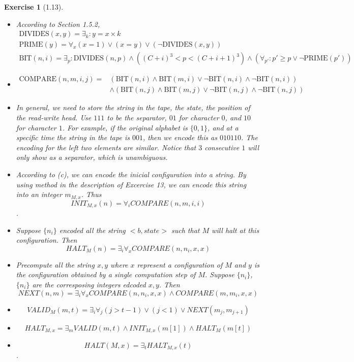 \documentclass[a4paper]{article}
\newtheorem*{exercise}{Exercise}
\newcommand{\bin}{\{0,1\}}
\begin{document}
\begin{exercise}[1.13]
	\begin{itemize}
		\item[(a)] According to Section 1.5.2, 
            \begin{gather*}
                \text{DIVIDES}(x,y)=\exists_k: y=x\times k\\
                \text{PRIME}(y)=\forall_x (x=1)\vee(x=y)\vee(\neg\text{DIVIDES}(x,y))\\
                \text{BIT}(n,i)=\exists_p: \text{DIVIDES}(n,p)\wedge ((C+i)^3<p<(C+i+1)^3) 
                \wedge (\forall_{p'}: p'\geq p\vee\neg\text{PRIME}(p'))
            \end{gather*}

		\item[(b)] 
            \begin{align*}
                \text{COMPARE}(n,m,i,j)=&(\text{BIT}(n,i)\wedge\text{BIT}(m,i)\vee\neg\text{BIT}(n,i)\wedge\neg\text{BIT}(n,i))\\
                &\wedge(\text{BIT}(n,j)\wedge\text{BIT}(m,j)\vee\neg\text{BIT}(n,j)\wedge\neg\text{BIT}(n,j))
            \end{align*}
	    \item[(c)] In general, we need to store the string in the tape, the state,
            the position of the read-write head. 
            Use $111$ to be the separator, $01$ for character $0$, and $10$ for character $1$. 
            For example, if the original alphabet is $\bin$, and at a specific time the string in the tape is $001$, 
            then we encode this as $010110$. The encoding for the left two elements are similar. 
            Notice that $3$ consecutive $1$ will only show as a separator, which is unambiguous.

\item[(d)] According to (c), we can encode the inicial configuration into a string. By using method in the description of Excercise 13, we can encode this string into an integer $m_{M,x}$. Thus 
$$INIT_{M,x}(n)=\forall_i COMPARE(n,m,i,i)$$.
\item[(e)] Suppose $\{n_i\}$ encoded all the string $<b,state>$ such that $M$ will halt at this configuration. Then 
$$
HALT_M(n)=\exists_i \forall_x COMPARE(n,n_i,x,x)
$$   
\item[(f)] Precompute all the string $x,y$ where $x$ represent a configuration of $M$ and $y$ is the configuration obtained by a single computation step of $M$. Suppose $\{n_i\}$,$\{n_i\}$ are the corresposing integers edcoded $x,y$.
Then 
$$
NEXT(n,m)=\exists_i\forall_x COMPARE(n,n_i,x,x)\wedge COMPARE(m,m_i,x,x)
$$
\item[(g)] 
$$
VALID_M(m,t)=\exists_i\forall_j (j>t-1)\vee(j<1)\vee NEXT(m_j,m_{j+1})
$$
\item[(h)] 
$$
HALT_{M,x}=\exists_m VALID(m,t)\wedge INIT_{M,x}(m[1])\wedge HALT_M(m[t])
$$
\item[(i)] 
$$HALT(M,x)=\exists_t HALT_{M,x}(t)$$.

	\end{itemize}
\end{exercise}
\end{document}
